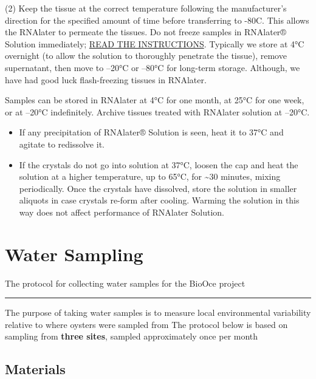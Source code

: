 \documentclass[
  letterpaper,
  DIV=11,
  numbers=noendperiod]{scrreprt}
\begin{document}
(2) Keep the tissue at the correct temperature following the
manufacturer's direction for the specified amount of time before
transferring to -80C. This allows the RNAlater to permeate the tissues.
Do not freeze samples in RNAlater® Solution immediately;
\href{https://www.thermofisher.com/content/dam/LifeTech/migration/en/filelibrary/nucleic-acid-purification-analysis/pdfs.par.18819.file.dat/bp-7020.pdf}{READ
THE INSTRUCTIONS}. Typically we store at 4°C overnight (to allow the
solution to thoroughly penetrate the tissue), remove supernatant, then
move to --20°C or --80°C for long-term storage. Although, we have had
good luck flash-freezing tissues in RNAlater.

Samples can be stored in RNAlater at 4°C for one month, at 25°C for one
week, or at --20°C indefinitely. Archive tissues treated with RNAlater
solution at --20°C.

\begin{itemize}
\item
  If any precipitation of RNAlater® Solution is seen, heat it to 37°C
  and agitate to redissolve it.
\item
  If the crystals do not go into solution at 37°C, loosen the cap and
  heat the solution at a higher temperature, up to 65°C, for
  \textasciitilde30 minutes, mixing periodically. Once the crystals have
  dissolved, store the solution in smaller aliquots in case crystals
  re-form after cooling. Warming the solution in this way does not
  affect performance of RNAlater Solution.
\end{itemize}

\hypertarget{water-sampling}{%
\chapter{Water Sampling}\label{water-sampling}}

The protocol for collecting water samples for the BioOce project

\begin{center}\rule{0.5\linewidth}{0.5pt}\end{center}

The purpose of taking water samples is to measure local environmental
variability relative to where oysters were sampled from The protocol
below is based on sampling from \textbf{three sites}, sampled
approximately once per month

\hypertarget{materials-3}{%
\section*{\texorpdfstring{\textbf{Materials}}{Materials}}\label{materials-3}}
\end{document}
